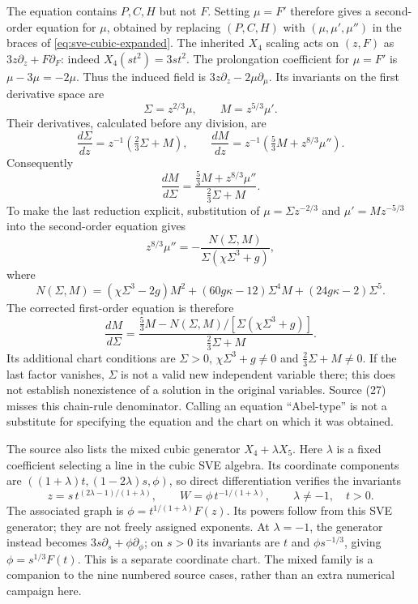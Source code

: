 \documentclass[11pt]{article}
\theoremstyle{definition}
\begin{document}
The equation contains $P,C,H$ but not $F$. Setting $\mu=F'$ therefore
gives a second-order equation for $\mu$, obtained by replacing
$(P,C,H)$ with $(\mu,\mu',\mu'')$ in the braces of
\eqref{eq:sve-cubic-expanded}. The inherited $X_4$ scaling acts on
$(z,F)$ as $3z\partial_z+F\partial_F$: indeed $X_4(st^2)=3st^2$.
The prolongation coefficient for $\mu=F'$ is $\mu-3\mu=-2\mu$.
Thus the induced field is $3z\partial_z-2\mu\partial_\mu$.
Its invariants on the first derivative space are
\[
 \Sigma=z^{2/3}\mu,\qquad M=z^{5/3}\mu'.
\]
Their derivatives, calculated before any division, are
\[
 \frac{d\Sigma}{dz}=z^{-1}(\tfrac23\Sigma+M),\qquad
 \frac{dM}{dz}=z^{-1}(\tfrac53M+z^{8/3}\mu'').
\]
Consequently
\begin{equation}
 \frac{dM}{d\Sigma}=
 \frac{\tfrac53M+z^{8/3}\mu''}{\tfrac23\Sigma+M}.
 \label{eq:sve-repro-mu}
\end{equation}
To make the last reduction explicit, substitution of
$\mu=\Sigma z^{-2/3}$ and $\mu'=Mz^{-5/3}$ into the second-order
equation gives
\[
 z^{8/3}\mu''=-\frac{N(\Sigma,M)}{\Sigma(\chi\Sigma^3+g)},
\]
where
\[
 N(\Sigma,M)=(\chi\Sigma^3-2g)M^2
       +(60g\kappa-12)\Sigma^4M+(24g\kappa-2)\Sigma^5.
\]
The corrected first-order equation is therefore
\begin{equation}
 \frac{dM}{d\Sigma}=
 \frac{\tfrac53M-N(\Sigma,M)/[\Sigma(\chi\Sigma^3+g)]}
      {\tfrac23\Sigma+M}.
 \label{eq:sve-cubic-first-order}
\end{equation}
Its additional chart conditions are $\Sigma>0$,
$\chi\Sigma^3+g\ne0$ and $\tfrac23\Sigma+M\ne0$.
If the last factor vanishes, $\Sigma$ is not a valid new independent
variable there; this does not establish nonexistence of a solution in the
original variables. Source (27) misses this chain-rule denominator.
Calling an equation ``Abel-type'' is not a substitute for specifying the
equation and the chart on which it was obtained.

The source also lists the mixed cubic generator $X_4+\lambda X_5$.
Here $\lambda$ is a fixed coefficient selecting a line in the cubic SVE
algebra. Its coordinate components are
$((1+\lambda)t,(1-2\lambda)s,\phi)$, so direct differentiation
verifies the invariants
\[
 z=s\,t^{(2\lambda-1)/(1+\lambda)},\qquad
 W=\phi\,t^{-1/(1+\lambda)},\qquad \lambda\ne-1,\quad t>0.
\]
The associated graph is $\phi=t^{1/(1+\lambda)}F(z)$.
Its powers follow from this SVE generator; they are not freely assigned
exponents. At $\lambda=-1$, the generator instead becomes
$3s\partial_s+\phi\partial_\phi$; on $s>0$ its invariants are
$t$ and $\phi s^{-1/3}$, giving $\phi=s^{1/3}F(t)$.
This is a separate coordinate chart. The mixed family is a companion to
the nine numbered source cases, rather than an extra numerical campaign here.
\end{document}
